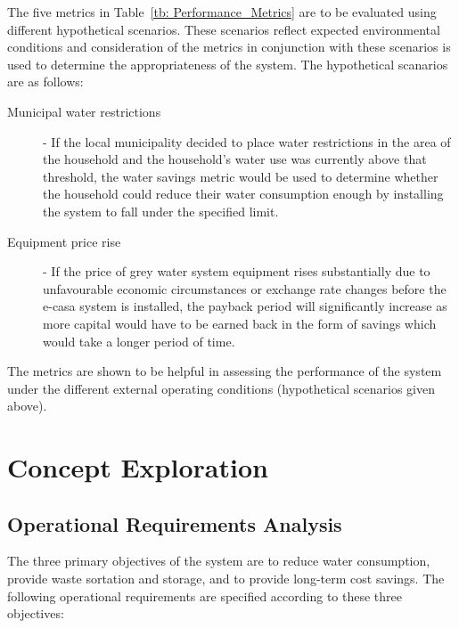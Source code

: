 \documentclass[a4paper,11pt,fleqn]{report}
\begin{document}
%
The five metrics in Table~\ref{tb: Performance_Metrics} are to be evaluated using different hypothetical scenarios. These scenarios reflect expected environmental conditions and consideration of the metrics in conjunction with these scenarios is used to determine the appropriateness of the system. The hypothetical scanarios are as follows:
%
\begin{description}
	\item[Municipal water restrictions] - If the local municipality decided to place water restrictions in the area of the household and the household's water use was currently above that threshold, the water savings metric would be used to determine whether the household could reduce their water consumption enough by installing the system to fall under the specified limit.
	\item[Equipment price rise] - If the price of grey water system equipment rises substantially due to unfavourable economic circumstances or exchange rate changes before the \ac{e-casa} system is installed, the payback period will significantly increase as more capital would have to be earned back in the form of savings which would take a longer period of time.
\end{description}

The metrics are shown to be helpful in assessing the performance of the system under the different external operating conditions (hypothetical scenarios given above). 

\section{Concept Exploration}
\subsection{Operational Requirements Analysis}
The three primary objectives of the system are to reduce water consumption, provide waste sortation and storage, and to provide long-term cost savings. The following operational requirements are specified according to these three objectives: \\
\end{document}
